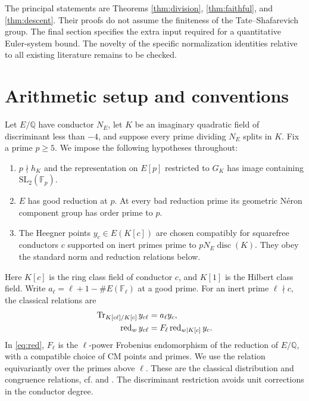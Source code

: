 \documentclass[11pt]{article}
\theoremstyle{definition}\newtheorem{definition}[theorem]{Definition}
\theoremstyle{remark}\newtheorem{remark}[theorem]{Remark}
\newcommand{\red}{\operatorname{red}}\newcommand{\ord}{\operatorname{ord}}
\begin{document}
The principal statements are Theorems \ref{thm:division}, \ref{thm:faithful}, and \ref{thm:descent}. Their proofs do not assume the finiteness of the Tate--Shafarevich group. The final section specifies the extra input required for a quantitative Euler-system bound. The novelty of the specific normalization identities relative to all existing literature remains to be checked.

\section{Arithmetic setup and conventions}
Let $E/\mathbb Q$ have conductor $N_E$, let $K$ be an imaginary quadratic field of discriminant less than $-4$, and suppose every prime dividing $N_E$ splits in $K$. Fix a prime $p\geq5$. We impose the following hypotheses throughout:
\begin{enumerate}[label=(H\arabic*)]
\item $p\nmid h_K$ and the representation on $E[p]$ restricted to $G_K$ has image containing $\mathrm{SL}_2(\mathbb F_p)$.
\item $E$ has good reduction at $p$. At every bad reduction prime its geometric N\'eron component group has order prime to $p$.
\item The Heegner points $y_c\in E(K[c])$ are chosen compatibly for squarefree conductors $c$ supported on inert primes prime to $pN_E\operatorname{disc}(K)$. They obey the standard norm and reduction relations below.
\end{enumerate}
Here $K[c]$ is the ring class field of conductor $c$, and $K[1]$ is the Hilbert class field. Write $a_\ell=\ell+1-\#E(\mathbb F_\ell)$ at a good prime. For an inert prime $\ell\nmid c$, the classical relations are
\begin{align}
 \Tr_{K[c\ell]/K[c]}y_{c\ell}&=a_\ell y_c,\label{eq:norm}\\
 \red_{w}y_{c\ell}&=F_\ell\red_{w|K[c]}y_c.\label{eq:red}
\end{align}
In \eqref{eq:red}, $F_\ell$ is the $\ell$-power Frobenius endomorphism of the reduction of $E/\mathbb Q$, with a compatible choice of CM points and primes. We use the relation equivariantly over the primes above $\ell$. These are the classical distribution and congruence relations, cf. \cite[Prop.~3.2]{BD} and \cite[\S1.7]{Howard}. The discriminant restriction avoids unit corrections in the conductor degree.
\end{document}
